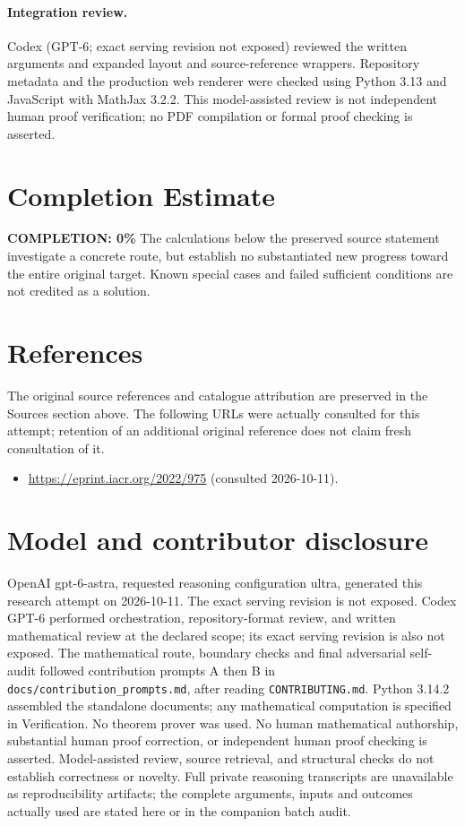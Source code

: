 \documentclass[11pt]{article}
\begin{document}
\paragraph{Integration review.} Codex (GPT-6; exact serving revision not exposed) reviewed the written arguments and expanded layout and source-reference wrappers. Repository metadata and the production web renderer were checked using Python 3.13 and JavaScript with MathJax 3.2.2. This model-assisted review is not independent human proof verification; no PDF compilation or formal proof checking is asserted.

\section{Completion Estimate}
\noindent\textbf{COMPLETION: 0\%}
The calculations below the preserved source statement investigate a concrete route,
but establish no substantiated new progress toward the entire original target.
Known special cases and failed sufficient conditions are not credited as a solution.
\section{References}
The original source references and catalogue attribution are preserved in the
Sources section above. The following URLs were actually consulted for this attempt;
retention of an additional original reference does not claim fresh consultation of it.
\begin{itemize}
\item \url{https://eprint.iacr.org/2022/975} (consulted 2026-10-11). 
\end{itemize}
\section{Model and contributor disclosure}
OpenAI gpt-6-astra, requested reasoning configuration ultra, generated this research
attempt on 2026-10-11. The exact serving revision is not exposed. Codex GPT-6
performed orchestration, repository-format review, and written mathematical review at the declared scope; its exact serving revision
is also not exposed. The mathematical route, boundary checks and final adversarial
self-audit followed contribution prompts A then B in
\texttt{docs/contribution\_prompts.md}, after reading \texttt{CONTRIBUTING.md}.
Python 3.14.2 assembled the standalone documents; any mathematical computation is
specified in Verification. No theorem prover was used. No human mathematical
authorship, substantial human proof correction, or independent human proof checking
is asserted. Model-assisted review, source retrieval, and structural checks do not
establish correctness or novelty. Full private reasoning transcripts are unavailable
as reproducibility artifacts; the complete arguments, inputs and outcomes actually
used are stated here or in the companion batch audit.
\end{document}
